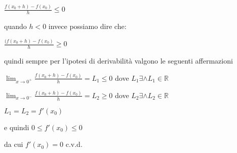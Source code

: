 \documentclass[../dimostrazioni]{subfiles}
\begin{document}
            \( \frac{f(x_0 + h) - f(x_0)}{h}  \leqslant 0\)

            quando \(h<0\) invece possiamo dire che:

            \( \frac{(f(x_0 + h) - f(x_0)}{h}  \geqslant 0\)

            quindi sempre per l'ipotesi di derivabilità valgono le seguenti affermazioni
            
            \(\lim_{x\to 0^+} \frac{f(x_0 + h) - f(x_0)}{h} = L_1 \leqslant 0 \) dove \( L_1 \exists \land L_1 \in \mathbb{R} \)

            \(\lim_{x\to 0^-} \frac{f(x_0 + h) - f(x_0)}{h} = L_2  \geqslant 0 \) dove \( L_2 \exists \land L_2 \in \mathbb{R} \)

            \(L_1 = L_2 = f'(x_0)\)
            
            e quindi
            \(0 \leqslant f'(x_0) \leqslant 0\)
            
            da cui
            \(f'(x_0)=0\) c.v.d.
\end{document}

